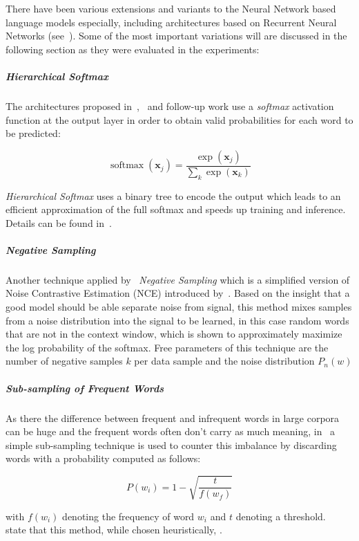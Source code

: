 There have been various extensions and variants to the Neural Network based language models especially, including architectures based on Recurrent Neural Networks (see~\cite{Mikolov:2012aa}). Some of the most important variations will are discussed in the following section as they were evaluated in the experiments:

\subparagraph{Hierarchical Softmax}
The architectures proposed in~\cite{Bengio:2000aa},~\cite{bengio2003neural} and follow-up work use a \emph{softmax} activation function at the output layer in order to obtain valid probabilities for each word to be predicted:

\begin{equation}
  \operatorname{softmax}(\mathbf{x}_j) = \frac{\exp(\mathbf{x}_j)}{\sum_k \exp(\mathbf{x}_k)}
\end{equation}

\emph{Hierarchical Softmax} uses a binary tree to encode the output which leads to an efficient approximation of the full softmax and speeds up training and inference. Details can be found in~\cite{Mikolov:2013ab}.

\subparagraph{Negative Sampling}
Another technique applied by~\cite{Mikolov:2013ab} \emph{Negative Sampling} which is a simplified version of Noise Contrastive Estimation (NCE) introduced by~\cite{Gutmann:2012aa}. Based on the insight that a good model should be able separate noise from signal, this method mixes samples from a noise distribution into the signal to be learned, in this case random words that are not in the context window, which is shown to approximately maximize the log probability of the softmax. Free parameters of this technique are the number of negative samples $k$ per data sample and the noise distribution $P_n(w)$

\subparagraph{Sub-sampling of Frequent Words}
As there the difference between frequent and infrequent words in large corpora can be huge and the frequent words often don't carry as much meaning, in~\cite{Mikolov:2013ab} a simple sub-sampling technique is used to counter this imbalance by discarding words with a probability computed as follows:

\begin{equation}
  P(w_i) = 1 - \sqrt{\frac{t}{f(w_f)}}
\end{equation}

with $f(w_i)$ denoting the frequency of word $w_i$ and $t$ denoting a threshold.~\cite{Mikolov:2013ab} state that this method, while chosen heuristically, .

